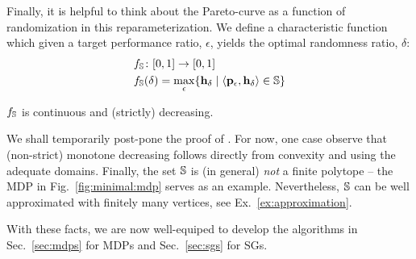 Finally, it is helpful to think about the Pareto-curve as a function of randomization in this reparameterization.  We define a characteristic function which given a target
performance ratio, $\epsilon$, yields the optimal randomness ratio,
$\delta$:
\begin{equation}
  \begin{split}
    & f_\mathbb{S}\colon [0,1] \rightarrow [0, 1]    \\
    & f_\mathbb{S}(\delta) = \max_\epsilon \{ \mathbf{h}_\delta \mid \langle
    \mathbf{p}_\epsilon, \mathbf{h}_\delta \rangle \in \mathbb{S} \} 
  \end{split}
\end{equation}
\begin{proposition}\label{prop:monotone}
  $f_\mathbb{S}$ is continuous and (strictly) decreasing.
\end{proposition}
 We shall temporarily post-pone the proof of
. For now, one case observe that
(non-strict) monotone decreasing follows directly from convexity and
using the adequate domains.
Finally, the set  $\mathbb{S}$ is (in general) \emph{not} a finite polytope -- the MDP in Fig.~\ref{fig:minimal:mdp} serves as an example. Nevertheless,  $\mathbb{S}$ can be well approximated with finitely many vertices, see Ex.~\ref{ex:approximation}.

With these facts, we are now well-equiped to develop the algorithms in Sec.~\ref{sec:mdps} for MDPs and Sec.~\ref{sec:sgs} for SGs.

